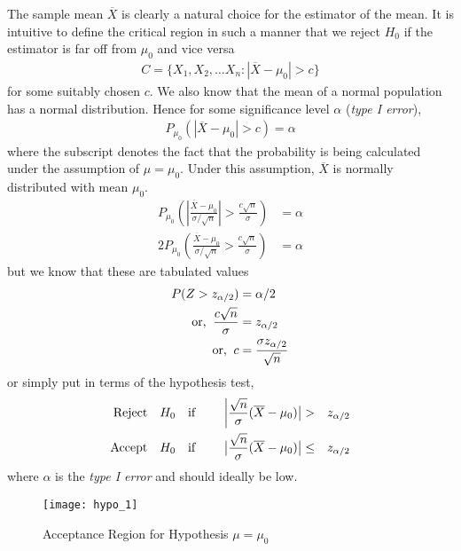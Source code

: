 \documentclass[../probability-notes.tex]{subfiles}
\begin{document}
    The sample mean $\overline{X}$ is clearly a natural choice for the estimator of the mean. It is intuitive to define the critical region in such a manner that we reject $H_{0}$ if the estimator is far off from $\mu_{0}$ and vice versa
    \begin{align*}
        C = \{ X_{1}, X_{2}, \ldots X_{n}: |\overline{X} - \mu_{0}| > c\}
    \end{align*}
    for some suitably chosen $c$. We also know that the mean of a normal population has a normal distribution. Hence for some significance level $\alpha$ (\emph{type I error}),
    \begin{align*}
        P_{\mu_{0}}(|\overline{X} - \mu_{0}| > c) = \alpha
    \end{align*}
    where the subscript denotes the fact that the probability is being calculated under the assumption of $\mu = \mu_{0}$. Under this assumption, $\overline{X}$ is normally distributed with mean $\mu_{0}$.
    \begin{align*}
        P_{\mu_{0}}(|\frac{\overline{X} - \mu_{0}}{\sigma/\sqrt{n}}| > \frac{c\sqrt{n}}{\sigma}) &= \alpha\\
        2P_{\mu_{0}}(\frac{\overline{X} - \mu_{0}}{\sigma/\sqrt{n}} > \frac{c\sqrt{n}}{\sigma}) &= \alpha
    \end{align*}
    but we know that these are tabulated values
    \begin{align*}
        P(Z > z_{\alpha/2}) &= \alpha/2\\
        \text{or, \:} \frac{c\sqrt{n}}{\sigma} &= z_{\alpha/2}\\
        \text{or, \:} c &= \frac{\sigma z_{\alpha/2}}{\sqrt{n}}
    \end{align*}
    or simply put in terms of the hypothesis test,
    \begin{alignat*}{4}
        \text{Reject\quad} &H_{0} \text{\quad if \quad} &\bigg\lvert \frac{\sqrt{n}}{\sigma}(\overline{X} - \mu_{0}) \big\rvert &> &z_{\alpha/2}\\
        \text{Accept\quad} &H_{0} \text{\quad if\quad} &\big\lvert \frac{\sqrt{n}}{\sigma}(\overline{X} - \mu_{0}) \big\rvert &\leq &z_{\alpha/2}\\
    \end{alignat*}
    where $\alpha$ is the \emph{type I error} and should ideally be low.

    \begin{figure}[h]
    \texttt{[image: hypo\_1]}
    \centering
    \caption{Acceptance Region for Hypothesis $\mu=\mu_{0}$}
    \label{fig:hypo_1} %
    \end{figure}
\end{document}
